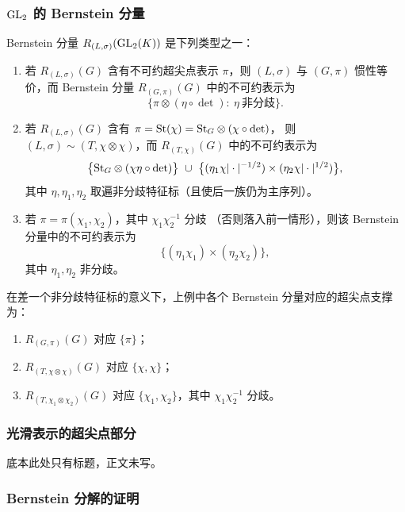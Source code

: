 \subsubsection{$\mathrm{GL}_2$ 的 Bernstein 分量}

\begin{example}[$n=2$]
Bernstein 分量 $R_{(L,\sigma)}(\mathrm{GL}_2(K))$ 是下列类型之一：
\begin{enumerate}[label=(\arabic*),leftmargin=2.2em]
\item 若 $R_{(L,\sigma)}(G)$ 含有不可约超尖点表示 $\pi$，则 $(L,\sigma)$ 与 $(G,\pi)$
      惯性等价，而 Bernstein 分量 $R_{(G,\pi)}(G)$ 中的不可约表示为
\[
\{\pi\otimes(\eta\circ\det):\ \eta\ \text{非分歧}\}.
\]
\item 若 $R_{(L,\sigma)}(G)$ 含有 $\pi=\mathrm{St}(\chi)=\mathrm{St}_G\otimes(\chi\circ\det)$，
      则 $(L,\sigma)\sim(T,\chi\otimes\chi)$，而 $R_{(T,\chi)}(G)$ 中的不可约表示为
\[
\bigl\{\mathrm{St}_G\otimes(\chi\eta\circ\det)\bigr\}
\ \cup\
\bigl\{(\eta_1\chi|\cdot|^{-1/2})\times(\eta_2\chi|\cdot|^{1/2})\bigr\},
\]
其中 $\eta,\eta_1,\eta_2$ 取遍非分歧特征标（且使后一族仍为主序列）。
\item 若 $\pi=\pi(\chi_1,\chi_2)$，其中 $\chi_1\chi_2^{-1}$ 分歧
      （否则落入前一情形），则该 Bernstein 分量中的不可约表示为
\[
\{(\eta_1\chi_1)\times(\eta_2\chi_2)\},
\]
其中 $\eta_1,\eta_2$ 非分歧。
\end{enumerate}
\end{example}

\begin{remark}
在差一个非分歧特征标的意义下，上例中各个 Bernstein 分量对应的超尖点支撑为：
\begin{enumerate}[label=(\arabic*),leftmargin=2.2em]
\item $R_{(G,\pi)}(G)$ 对应 $\{\pi\}$；
\item $R_{(T,\chi\otimes\chi)}(G)$ 对应 $\{\chi,\chi\}$；
\item $R_{(T,\chi_1\otimes\chi_2)}(G)$ 对应 $\{\chi_1,\chi_2\}$，其中 $\chi_1\chi_2^{-1}$ 分歧。
\end{enumerate}
\end{remark}

\subsubsection{光滑表示的超尖点部分}

底本此处只有标题，正文未写。

\subsubsection{Bernstein 分解的证明}

